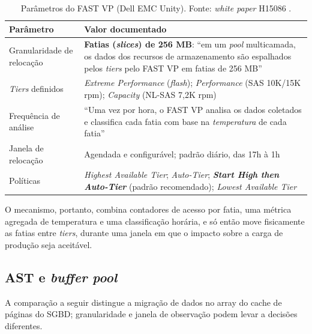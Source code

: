\documentclass[11pt,a4paper]{article}
\begin{document}
\begin{table}[H]
\centering
\caption{Parâmetros do FAST VP (Dell EMC Unity). Fonte: \textit{white paper} H15086 \cite{dellfast}.}
\label{tab:fast}
{\footnotesize
\begin{tabular}{@{}p{4.2cm}p{10.4cm}@{}}
\toprule
\textbf{Parâmetro} & \textbf{Valor documentado} \\
\midrule
Granularidade de relocação & \textbf{Fatias (\textit{slices}) de 256 MB}: ``em um \textit{pool}
multicamada, os dados dos recursos de armazenamento são espalhados pelos \textit{tiers} pelo FAST
VP em fatias de 256 MB'' \\
\textit{Tiers} definidos & \textit{Extreme Performance} (\textit{flash}); \textit{Performance}
(SAS 10K/15K rpm); \textit{Capacity} (NL-SAS 7,2K rpm) \\
Frequência de análise & ``Uma vez por hora, o FAST VP analisa os dados coletados e classifica cada
fatia com base na \emph{temperatura} de cada fatia'' \\
Janela de relocação & Agendada e configurável; padrão diário, das 17h à 1h \\
Políticas & \textit{Highest Available Tier}; \textit{Auto-Tier}; \textbf{\textit{Start High then
Auto-Tier}} (padrão recomendado); \textit{Lowest Available Tier} \\
\bottomrule
\end{tabular}}
\end{table}

O mecanismo, portanto, combina contadores de acesso por fatia, uma métrica agregada de
temperatura e uma classificação horária, e só então move fisicamente as fatias entre \textit{tiers},
durante uma janela em que o impacto sobre a carga de produção seja aceitável.

\subsection{AST e \textit{buffer pool}}
\label{sec:asttensao}

A comparação a seguir distingue a migração de dados no array do cache de páginas do SGBD; granularidade e janela de observação podem levar a decisões diferentes.
\end{document}

